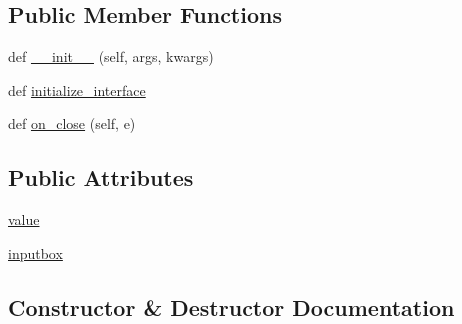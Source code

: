 \subsection*{Public Member Functions}
\begin{DoxyCompactItemize}
\item 
def \hyperlink{class_uni_dec_1_1unidec__modules_1_1miscwindows_1_1_single_input_dialog_a828986681121f8bf000570daecfbfafa}{\+\_\+\+\_\+init\+\_\+\+\_\+} (self, args, kwargs)
\item 
def \hyperlink{class_uni_dec_1_1unidec__modules_1_1miscwindows_1_1_single_input_dialog_a12f86ef42165045655730b4ddec6946d}{initialize\+\_\+interface}
\item 
def \hyperlink{class_uni_dec_1_1unidec__modules_1_1miscwindows_1_1_single_input_dialog_ae32996fad3292417c1612c1c8684de01}{on\+\_\+close} (self, e)
\end{DoxyCompactItemize}
\subsection*{Public Attributes}
\begin{DoxyCompactItemize}
\item 
\hyperlink{class_uni_dec_1_1unidec__modules_1_1miscwindows_1_1_single_input_dialog_ac1f7ab7d4e2275b67387e0a83d02694a}{value}
\item 
\hyperlink{class_uni_dec_1_1unidec__modules_1_1miscwindows_1_1_single_input_dialog_a8107fecdad52394036b5a35c7a7ba18e}{inputbox}
\end{DoxyCompactItemize}


\subsection{Constructor \& Destructor Documentation}
\hypertarget{class_uni_dec_1_1unidec__modules_1_1miscwindows_1_1_single_input_dialog_a828986681121f8bf000570daecfbfafa}{}
